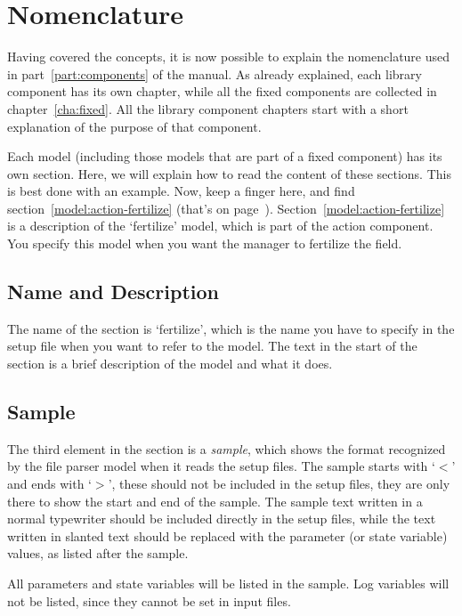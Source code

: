 \section{Nomenclature}

Having covered the concepts, it is now possible to explain the
nomenclature used in part~\ref{part:components} of the manual.  As
already explained, each library component has its own chapter, while
all the fixed components are collected in chapter~\ref{cha:fixed}.
All the library component chapters start with a short explanation of
the purpose of that component.

Each model (including those models that are part of a fixed component)
has its own section.  Here, we will explain how to read the content
of these sections.  This is best done with an example.  Now, keep a
finger here, and find section~\ref{model:action-fertilize} (that's on
page~\pageref{model:action-fertilize}).
Section~\ref{model:action-fertilize} is a description of the
`fertilize' model, which is part of the action component.  You specify
this model when you want the manager to fertilize the field.  

\subsection{Name and Description}

The name of the section is `fertilize', which is the name you have to
specify in the setup file when you want to refer to the model.  The
text in the start of the section is a brief description of the model
and what it does.

\subsection{Sample}
\label{sec:sample}

The third element in the section is a \emph{sample}, which shows the
format recognized by the file parser model when it reads the setup
files.  The sample starts with `\texttt{$<$}' and ends with
`\texttt{$>$}', these should not be included in the setup files, they
are only there to show the start and end of the sample.  The sample
text written in a normal typewriter should be included directly in the
setup files, while the text written in slanted text should be replaced
with the parameter (or state variable) values, as listed after the
sample.

All parameters and state variables will be listed in the sample.  Log
variables will not be listed, since they cannot be set in input files.


